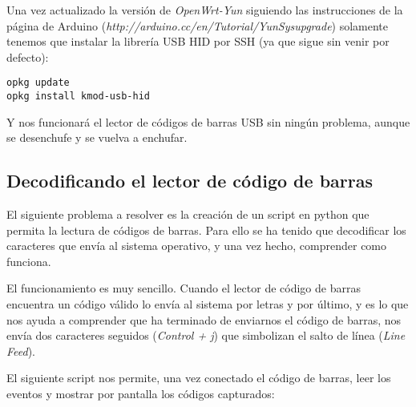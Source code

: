 Una vez actualizado la versión de \emph{OpenWrt-Yun} siguiendo las instrucciones de la página de Arduino (\emph{http://arduino.cc/en/Tutorial/YunSysupgrade}) solamente tenemos que instalar la librería USB HID por SSH (ya que sigue sin venir por defecto):

	\begin{lstlisting}
opkg update
opkg install kmod-usb-hid
	\end{lstlisting}

Y nos funcionará el lector de códigos de barras USB sin ningún problema, aunque se desenchufe y se vuelva a enchufar.

\subsection{Decodificando el lector de código de barras}

El siguiente problema a resolver es la creación de un script en python que permita la lectura de códigos de barras. Para ello se ha tenido que decodificar los caracteres que envía al sistema operativo, y una vez hecho, comprender como funciona.

El funcionamiento es muy sencillo. Cuando el lector de código de barras encuentra un código válido lo envía al sistema por letras y por último, y es lo que nos ayuda a comprender que ha terminado de enviarnos el código de barras, nos envía dos caracteres seguidos (\emph{Control + j}) que simbolizan el salto de línea (\emph{Line Feed}).

El siguiente script nos permite, una vez conectado el código de barras, leer los eventos y mostrar por pantalla los códigos capturados:

